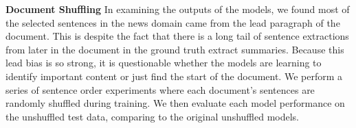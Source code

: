 \textbf{Document Shuffling} In examining the outputs of the models, we found
most of the selected sentences in the news domain came from the lead paragraph
of the document. This is despite the fact that there is a long tail of 
sentence extractions from later in the document in the ground truth extract 
summaries. Because this lead bias is so strong, it is questionable whether
the models are learning to identify important content or just find the start
of the document. We perform a series of sentence order experiments where 
each document's sentences are randomly shuffled during training. We then
evaluate each model performance on the unshuffled test data, comparing to 
the original unshuffled models. 






